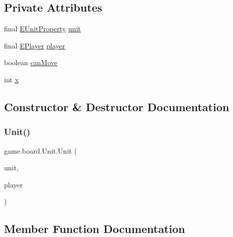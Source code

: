 \subsection*{Private Attributes}
\begin{DoxyCompactItemize}
\item 
final \mbox{\hyperlink{enumrule_engine_1_1entity_1_1_e_unit_property}{E\+Unit\+Property}} \mbox{\hyperlink{classgame_1_1board_1_1_unit_aa705b919e02dc57b8084bbdc57840f68}{unit}}
\item 
final \mbox{\hyperlink{enumgame_1_1_e_player}{E\+Player}} \mbox{\hyperlink{classgame_1_1board_1_1_unit_a34d0e94c098e91431f95bdd4ae56f4e2}{player}}
\item 
boolean \mbox{\hyperlink{classgame_1_1board_1_1_unit_a56718dfd790432ee280596574f6f954e}{can\+Move}}
\item 
int \mbox{\hyperlink{classgame_1_1board_1_1_unit_a98cffe207391fa08955cd64f71044e38}{x}}
\end{DoxyCompactItemize}


\subsection{Constructor \& Destructor Documentation}
\mbox{\label{classgame_1_1board_1_1_unit_aa4decf509663321bd179b5c1c4bc6db7}} 
\subsubsection{\texorpdfstring{Unit()}{Unit()}}
{\footnotesize\ttfamily game.\+board.\+Unit.\+Unit (\begin{DoxyParamCaption}\item[{\mbox{\hyperlink{enumrule_engine_1_1entity_1_1_e_unit_property}{E\+Unit\+Property}}}]{unit,  }\item[{\mbox{\hyperlink{enumgame_1_1_e_player}{E\+Player}}}]{player }\end{DoxyParamCaption})\hspace{0.3cm}{\ttfamily [inline]}}



\subsection{Member Function Documentation}
\mbox{\label{classgame_1_1board_1_1_unit_ad4f3140a22fc3d4dfb3ecaede3e15d8b}} 
